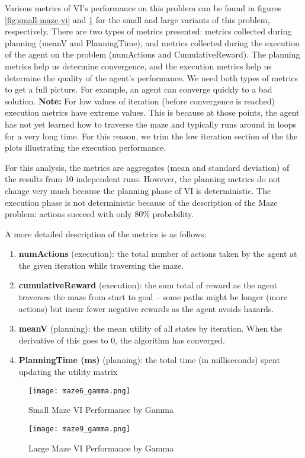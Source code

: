 \documentclass{article}
\begin{document}
Various metrics of VI's performance on this problem can be found in figures \ref{fig:small-maze-vi}
and \ref{fig:large-maze-vi} for the small and large variants of this problem, respectively. There
are two types of metrics presented: metrics collected during planning (meanV and PlanningTime),
and metrics collected during the execution of the agent on the problem (numActions and
CumulativeReward). The planning metrics help us determine convergence, and the execution metrics help
us determine the quality of the agent's performance. We need both types of metrics to get a full
picture. For example, an agent can converge quickly to a bad solution. \textbf{Note:} For low
values of iteration (before convergence is reached) execution metrics have extreme values. This is
because at those points, the agent has not yet learned how to traverse the maze and typically
runs around in loops for a very long time. For this reason, we trim the low iteration section of the
the plots illustrating the execution performance.

For this analysis, the metrics are aggregates (mean and standard deviation) of the results from
10 independent runs. However, the planning metrics do not change very much because the planning
phase of VI is deterministic. The execution phase is not deterministic because of the description
of the Maze problem: actions succeed with only 80\% probability.

A more detailed description of the metrics is as follows: 

\begin{enumerate}
    \item \textbf{numActions} (execution): the total number of actions taken by the agent at the
    given iteration while traversing the maze.
    \item \textbf{cumulativeReward} (execution): the sum total of reward as the agent traverses the
    maze from start to goal -- some paths might be longer (more actions) but incur fewer negative 
    rewards as the agent avoids hazards.
    \item \textbf{meanV} (planning): the mean utility of all states by iteration. When the derivative
    of this goes to 0, the algorithm has converged.
    \item \textbf{PlanningTime (ms)} (planning): the total time (in milliseconds) spent updating the
    utility matrix
\end{enumerate}

\begin{figure}
    \centering
    \begin{minipage}{0.5\textwidth}
        \centering
        \texttt{[image: maze6\_gamma.png]}
        \caption{Small Maze VI Performance by Gamma}
        \label{fig:small-maze-vi}
    \end{minipage}\hfill
    \begin{minipage}{0.5\textwidth}
        \centering
        \texttt{[image: maze9\_gamma.png]}
        \caption{Large Maze VI Performance by Gamma}
        \label{fig:large-maze-vi}
    \end{minipage}
\end{figure}
\end{document}
